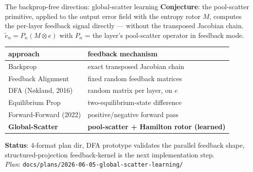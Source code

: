 \documentclass[aspectratio=169, 11pt]{beamer}
\begin{document}
\begin{frame}{The backprop-free direction: global-scatter learning}
  \textbf{Conjecture}: the pool-scatter primitive, applied to the
  output error field with the entropy rotor $M$, computes the
  per-layer feedback signal directly --- without the transposed
  Jacobian chain.
  \\[1mm]
  $\tilde{e}_n = P_n(M \otimes e)$ \quad with $P_n$ = the layer's
  pool-scatter operator in feedback mode.

  \vspace{3mm}
  \begin{tabular}{ll}
  \toprule
  approach              & feedback mechanism \\
  \midrule
  Backprop              & exact transposed Jacobian chain \\
  Feedback Alignment    & fixed random feedback matrices \\
  DFA (N\o kland, 2016) & random matrix per layer, on $e$ \\
  Equilibrium Prop      & two-equilibrium-state difference \\
  Forward-Forward (2022)& positive/negative forward pass \\
  \textbf{Global-Scatter} & \textbf{pool-scatter + Hamilton rotor (learned)} \\
  \bottomrule
  \end{tabular}

  \vspace{3mm}
  \textbf{Status}: 4-format plan dir, DFA prototype validates the
  parallel feedback shape, structured-projection feedback-kernel is
  the next implementation step. \\
  \emph{Plan}: \texttt{docs/plans/2026-06-05-global-scatter-learning/}
\end{frame}
\end{document}
